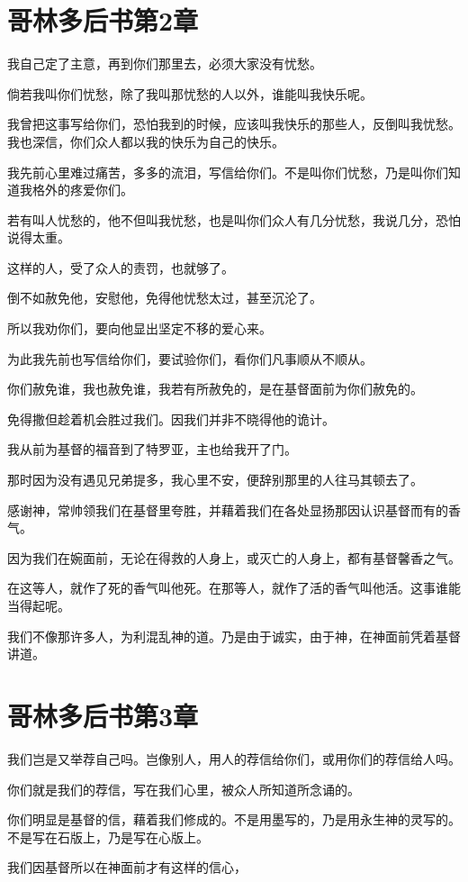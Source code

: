 \documentclass[12pt,oneside]{book}
\begin{document}
\chapter{哥林多后书第2章}
我自己定了主意，再到你们那里去，必须大家没有忧愁。

倘若我叫你们忧愁，除了我叫那忧愁的人以外，谁能叫我快乐呢。

我曾把这事写给你们，恐怕我到的时候，应该叫我快乐的那些人，反倒叫我忧愁。我也深信，你们众人都以我的快乐为自己的快乐。

我先前心里难过痛苦，多多的流泪，写信给你们。不是叫你们忧愁，乃是叫你们知道我格外的疼爱你们。

若有叫人忧愁的，他不但叫我忧愁，也是叫你们众人有几分忧愁，我说几分，恐怕说得太重。

这样的人，受了众人的责罚，也就够了。

倒不如赦免他，安慰他，免得他忧愁太过，甚至沉沦了。

所以我劝你们，要向他显出坚定不移的爱心来。

为此我先前也写信给你们，要试验你们，看你们凡事顺从不顺从。

你们赦免谁，我也赦免谁，我若有所赦免的，是在基督面前为你们赦免的。

免得撒但趁着机会胜过我们。因我们并非不晓得他的诡计。

我从前为基督的福音到了特罗亚，主也给我开了门。

那时因为没有遇见兄弟提多，我心里不安，便辞别那里的人往马其顿去了。

感谢神，常帅领我们在基督里夸胜，并藉着我们在各处显扬那因认识基督而有的香气。

因为我们在婉面前，无论在得救的人身上，或灭亡的人身上，都有基督馨香之气。

在这等人，就作了死的香气叫他死。在那等人，就作了活的香气叫他活。这事谁能当得起呢。

我们不像那许多人，为利混乱神的道。乃是由于诚实，由于神，在神面前凭着基督讲道。

\chapter{哥林多后书第3章}
我们岂是又举荐自己吗。岂像别人，用人的荐信给你们，或用你们的荐信给人吗。

你们就是我们的荐信，写在我们心里，被众人所知道所念诵的。

你们明显是基督的信，藉着我们修成的。不是用墨写的，乃是用永生神的灵写的。不是写在石版上，乃是写在心版上。

我们因基督所以在神面前才有这样的信心，
\end{document}
